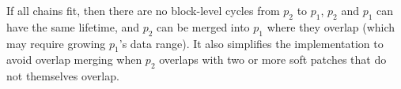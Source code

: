 \begin{comment}
%
It checks that every path starting at $p_1$ fits at least one of the
following cases:


%
% 
%

\begin{xcompactitemize}
\item $p_1 \PDDepend p_2$.
\item $p_1 \PDDepend h$, where $h$ is the \nrb\ \patch\ on $\PBlock{p_1}$.
\item $p_1 \PDDepend q$, where $q \not\in \PMem$.
\item $p_1 \PDDepend q$, where $p_2 \PDDepend q$.
\item $p_1 \PDDepend q$, where $\PDepset{q} \subseteq \PDepset{p_2}$
  and $|\PDepset{q}| \leq 2$.
\item Has length at most 10, traverses no node with more than 10
  direct dependencies, and does not traverse $p_2$.\todo{Yuck\ldots}
\end{xcompactitemize}

\noindent
\end{comment}
%
If all chains fit, then there are no block-level cycles from $p_2$
to $p_1$, $p_2$ and $p_1$ can have the same lifetime, and $p_2$ can be
merged into $p_1$ where they overlap
%
(which may require growing $p_1$'s data range).
%
It also simplifies the implementation to avoid overlap merging when $p_2$
overlaps with two or more soft patches that do not themselves overlap.

